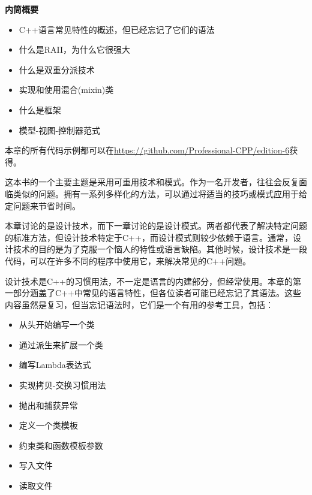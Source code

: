 \noindent
\textbf{内筒概要}

\begin{itemize}
\item
C++语言常见特性的概述，但已经忘记了它们的语法

\item
什么是RAII，为什么它很强大

\item
什么是双重分派技术
\item
实现和使用混合(mixin)类

\item
什么是框架

\item
模型-视图-控制器范式
\end{itemize}

本章的所有代码示例都可以在\url{https://github.com/Professional-CPP/edition-6}获得。

这本书的一个主要主题是采用可重用技术和模式。作为一名开发者，往往会反复面临类似的问题。拥有一系列多样化的方法，可以通过将适当的技巧或模式应用于给定问题来节省时间。

本章讨论的是设计技术，而下一章讨论的是设计模式。两者都代表了解决特定问题的标准方法，但设计技术特定于C++，而设计模式则较少依赖于语言。通常，设计技术的目的是为了克服一个恼人的特性或语言缺陷。其他时候，设计技术是一段代码，可以在许多不同的程序中使用它，来解决常见的C++问题。

设计技术是C++的习惯用法，不一定是语言的内建部分，但经常使用。本章的第一部分涵盖了C++中常见的语言特性，但各位读者可能已经忘记了其语法。这些内容虽然是复习，但当忘记语法时，它们是一个有用的参考工具，包括：

\begin{itemize}
\item
从头开始编写一个类

\item
通过派生来扩展一个类

\item
编写Lambda表达式

\item
实现拷贝-交换习惯用法

\item
抛出和捕获异常

\item
定义一个类模板

\item
约束类和函数模板参数

\item
写入文件

\item
读取文件
\end{itemize}

